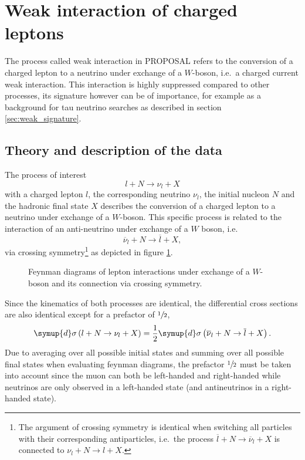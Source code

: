 \section{Weak interaction of charged leptons}

The process called weak interaction in PROPOSAL refers to the conversion of a charged lepton to a neutrino under exchange of a $W$-boson, i.e.\ a charged current weak interaction.
This interaction is highly suppressed compared to other processes, its signature however can be of importance, for example as a background for tau neutrino searches as described in section \ref{sec:weak_signature}.

\subsection{Theory and description of the data}
\label{sec:weak_theory}

The process of interest
%
\begin{equation}
    \label{eqn:weak_lepton}
    l + N \rightarrow \nu_l + X
\end{equation}
%
with a charged lepton $l$, the corresponding neutrino $\nu_l$, the initial nucleon $N$ and the hadronic final state $X$ describes the conversion of a charged lepton to a neutrino under exchange of a $W$-boson.
This specific process is related to the interaction of an anti-neutrino under exchange of a $W$ boson, i.e.\
%
\begin{equation}
    \label{eqn:weak_neutrino}
    \overline{\nu}_l + N \rightarrow \overline{l} + X,
\end{equation}
%
via crossing symmetry\footnote{The argument of crossing symmetry is identical when switching all particles with their corresponding antiparticles, i.e.\ the process $\overline{l} + N \rightarrow \overline{\nu}_l + X$ is connected to $\nu_l + N \rightarrow l + X$.} as depicted in figure \ref{fig:feynman_weak}.
%
\begin{figure}
    \centering
    
    \caption{Feynman diagrams of lepton interactions under exchange of a $W$-boson and its connection via crossing symmetry.}
    \label{fig:feynman_weak}
\end{figure}
%
Since the kinematics of both processes are identical, the differential cross sections are also identical except for a prefactor of $\sfrac{1}{2}$,
%
\begin{equation}
    \symup{d}\sigma\left( l + N \rightarrow \nu_l + X \right) = \frac{1}{2} \symup{d}\sigma\left( \overline{\nu}_l + N \rightarrow \overline{l} + X \right).
\end{equation}
%
Due to averaging over all possible initial states and summing over all possible final states when evaluating feynman diagrams, the prefactor $\sfrac{1}{2}$ must be taken into account since the muon can both be left-handed and right-handed while neutrinos are only observed in a left-handed state (and antineutrinos in a right-handed state).

